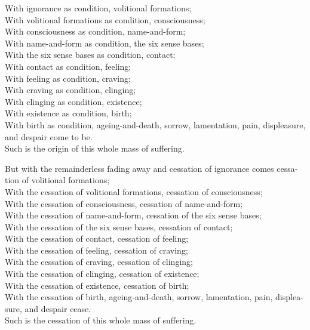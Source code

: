 \begin{english}
  With ignorance as condition, volitional formations;\\
  With volitional formations as condition, consciousness;\\
  With consciousness as condition, name-and-form;\\
  With name-and-form as condition, the six sense bases;\\
  With the six sense bases as condition, contact;\\
  With contact as condition, feeling;\\
  With feeling as condition, craving;\\
  With craving as condition, clinging;\\
  With clinging as condition, existence;\\
  With existence as condition, birth;\\
  With birth as condition, ageing-and-death, sorrow, lamentation, pain, displeasure, and despair come to be.\\
  Such is the origin of this whole mass of suffering.

  But with the remainderless fading away and cessation of ignorance comes cessation of volitional formations;\\
  With the cessation of volitional formations, cessation of consciousness;\\
  With the cessation of consciousness, cessation of name-and-form;\\
  With the cessation of name-and-form, cessation of the six sense bases;\\
  With the cessation of the six sense bases, cessation of contact;\\
  With the cessation of contact, cessation of feeling;\\
  With the cessation of feeling, cessation of craving;\\
  With the cessation of craving, cessation of clinging;\\
  With the cessation of clinging, cessation of existence;\\
  With the cessation of existence, cessation of birth;\\
  With the cessation of birth, ageing-and-death, sorrow, lamentation, pain, displeasure, and despair cease.\\
  Such is the cessation of this whole mass of suffering.
\end{english}

\suttaRef{[SN 12.1]}

